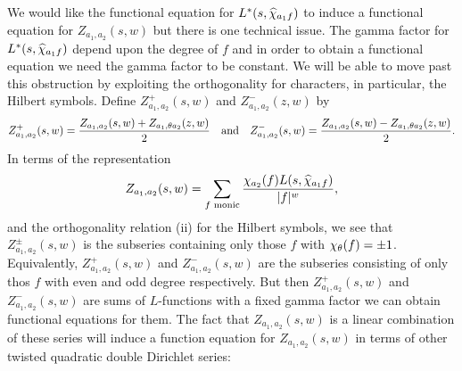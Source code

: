 \documentclass[12pt,reqno,oneside]{amsart}
\begin{document}
    We would like the functional equation for $L^{\ast}(s,\widehat{\chi}_{a_{1}f})$ to induce a functional equation for $Z_{a_{1},a_{2}}(s,w)$ but there is one technical issue. The gamma factor for $L^{\ast}(s,\widehat{\chi}_{a_{1}f})$ depend upon the degree of $f$ and in order to obtain a functional equation we need the gamma factor to be constant. We will be able to move past this obstruction by exploiting the orthogonality for characters, in particular, the Hilbert symbols. Define $Z_{a_{1},a_{2}}^{+}(s,w)$ and $Z_{a_{1},a_{2}}^{-}(z,w)$ by
    \[
        Z_{a_{1},a_{2}}^{+}(s,w) = \frac{Z_{a_{1},a_{2}}(s,w)+Z_{a_{1},\theta a_{2}}(z,w)}{2} \quad \text{and} \quad Z_{a_{1},a_{2}}^{-}(s,w) = \frac{Z_{a_{1},a_{2}}(s,w)-{Z_{a_{1},\theta a_{2}}(z,w)}}{2}.
    \]
    In terms of the representation
    \[
        Z_{a_{1},a_{2}}(s,w) = \sum_{\text{$f$ monic}}\frac{\chi_{a_{2}}(f)L(s,\widehat{\chi}_{a_{1}f})}{|f|^{w}},
    \]
    and the orthogonality relation (ii) for the Hilbert symbols, we see that $Z_{a_{1},a_{2}}^{\pm}(s,w)$ is the subseries containing only those $f$ with $\chi_{\theta}(f) = \pm 1$. Equivalently, $Z_{a_{1},a_{2}}^{+}(s,w)$ and $Z_{a_{1},a_{2}}^{-}(s,w)$ are the subseries consisting of only thos $f$ with even and odd degree respectively. But then $Z_{a_{1},a_{2}}^{+}(s,w)$ and $Z_{a_{1},a_{2}}^{-}(s,w)$ are sums of $L$-functions with a fixed gamma factor we can obtain functional equations for them. The fact that $Z_{a_{1},a_{2}}(s,w)$ is a linear combination of these series will induce a function equation for $Z_{a_{1},a_{2}}(s,w)$ in terms of other twisted quadratic double Dirichlet series:
\end{document}
